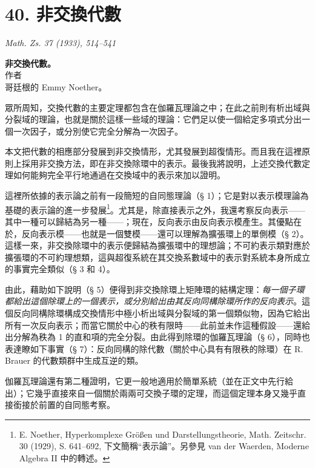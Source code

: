 \documentclass[11pt]{article}
\begin{document}
\setcounter{footnote}{0}

\section*{40. 非交換代數}

\begin{center}
\emph{Math. Zs. 37 (1933), 514--541}
\end{center}

\begin{center}
\textbf{非交換代數。}\\[0.5em]
作者\\[0.25em]
哥廷根的 Emmy Noether。
\end{center}

眾所周知，交換代數的主要定理都包含在伽羅瓦理論之中；在此之前則有析出域與分裂域的理論，也就是關於這樣一些域的理論：它們足以使一個給定多項式分出一個一次因子，或分別使它完全分解為一次因子。

本文把代數的相應部分發展到非交換情形，尤其發展到超復情形。而且我在這裡原則上採用非交換方法，即在非交換除環中的表示。最後我將說明，上述交換代數定理如何能夠完全平行地通過在交換域中的表示來加以證明。

這裡所依據的表示論之前有一段簡短的自同態理論（§ 1）；它是對以表示模理論為基礎的表示論的進一步發展\footnote{E. Noether, Hyperkomplexe Größen und Darstellungstheorie, Math. Zeitschr. 30 (1929), S. 641--692, 下文簡稱“表示論”。另參見 van der Waerden, Moderne Algebra II 中的轉述。}。尤其是，除直接表示之外，我還考察反向表示——其中一種可以歸結為另一種——；現在，反向表示由反向表示模產生。其優點在於，反向表示模——也就是一個雙模——還可以理解為擴張環上的單側模（§ 2）。這樣一來，非交換除環中的表示便歸結為擴張環中的理想論；不可約表示類對應於擴張環的不可約理想類，這與超復系統在其交換系數域中的表示對系統本身所成立的事實完全類似（§ 3 和 4）。

由此，藉助如下說明（§ 5）便得到非交換除環上矩陣環的結構定理：\emph{每一個子環都給出這個除環上的一個表示，或分別給出由其反向同構除環所作的反向表示}。這個反向同構除環構成交換情形中極小析出域與分裂域的第一個類似物，因為它給出所有一次反向表示；而當它關於中心的秩有限時——此前並未作這種假設——還給出分解為秩為 1 的直和項的完全分裂。由此得到除環的伽羅瓦理論（§ 6），同時也表達瞭如下事實（§ 7）：反向同構的除代數（關於中心具有有限秩的除環）在 R. Brauer 的代數類群中生成互逆的類。

伽羅瓦理論還有第二種證明，它更一般地適用於簡單系統（並在正文中先行給出）；它幾乎直接來自一個關於兩兩可交換子環的定理，而這個定理本身又幾乎直接銜接於前置的自同態考察。
\end{document}
